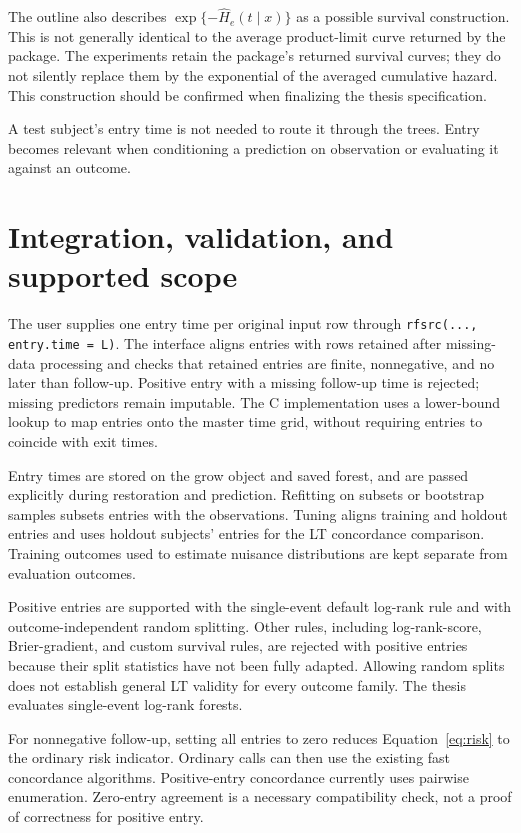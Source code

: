 The outline also describes $\exp\{-\widehat H_e(t\mid x)\}$ as a possible
survival construction. This is not generally identical to the average
product-limit curve returned by the package. The experiments retain the
package's returned survival curves; they do not silently replace them by
the exponential of the averaged cumulative hazard. This construction should
be confirmed when finalizing the thesis specification.

A test subject's entry time is not needed to route it through the trees.
Entry becomes relevant when conditioning a prediction on observation or
evaluating it against an outcome.

\section{Integration, validation, and supported scope}
The user supplies one entry time per original input row through
\texttt{rfsrc(..., entry.time = L)}. The interface aligns entries with rows
retained after missing-data processing and checks that retained entries are
finite, nonnegative, and no later than follow-up. Positive entry with a
missing follow-up time is rejected; missing predictors remain imputable.
The C implementation uses a lower-bound lookup to map entries onto the
master time grid, without requiring entries to coincide with exit times.

Entry times are stored on the grow object and saved forest, and are passed
explicitly during restoration and prediction. Refitting on subsets or
bootstrap samples subsets entries with the observations. Tuning aligns
training and holdout entries and uses holdout subjects' entries for the LT
concordance comparison. Training outcomes used to estimate nuisance
distributions are kept separate from evaluation outcomes.

Positive entries are supported with the single-event default log-rank rule
and with outcome-independent random splitting. Other rules, including
log-rank-score, Brier-gradient, and custom survival rules, are rejected with
positive entries because their split statistics have not been fully adapted.
Allowing random splits does not establish general LT validity for every
outcome family. The thesis evaluates single-event log-rank forests.

For nonnegative follow-up, setting all entries to zero reduces
Equation~\eqref{eq:risk} to the ordinary risk indicator. Ordinary calls can
then use the existing fast concordance algorithms. Positive-entry
concordance currently uses pairwise enumeration. Zero-entry agreement is a
necessary compatibility check, not a proof of correctness for positive entry.

